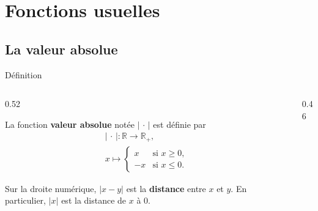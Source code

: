 \documentclass[aspectratio=169,11pt]{beamer}
\newcommand{\R}{\mathbb{R}}
\newcommand{\key}[1]{\textbf{\color{DarkBlue}#1}}
\newcommand{\fonc}[3]{#1\colon #2\to #3}
\begin{document}
\section{Fonctions usuelles}

\subsection{La valeur absolue}

\begin{frame}[shrink=10]{Définition}
	\begin{columns}[c]
		\begin{column}{0.52\textwidth}
			\begin{definitionbox}
				La fonction \key{valeur absolue} notée $\lvert\,\cdot\,\rvert$ est définie par
				\[
					\begin{array}{ll}
						\fonc{\lvert\,\cdot\,\rvert}{\R}{\R_+} , \\[4pt]
						x\longmapsto
						\begin{cases}
							x & \text{si } x\ge 0, \\
							-x & \text{si } x\le 0.
						\end{cases}
					\end{array}
				\]
			\end{definitionbox}
			\vspace{0.15cm}
			\begin{attentionbox}
				Sur la droite numérique, $\lvert x-y\rvert$ est la \key{distance}
				entre $x$ et $y$. En particulier, $\lvert x\rvert$ est la distance
				de $x$ à $0$.
			\end{attentionbox}
		\end{column}
		\begin{column}{0.46\textwidth}
		\end{column}
	\end{columns}
\end{frame}
\end{document}
